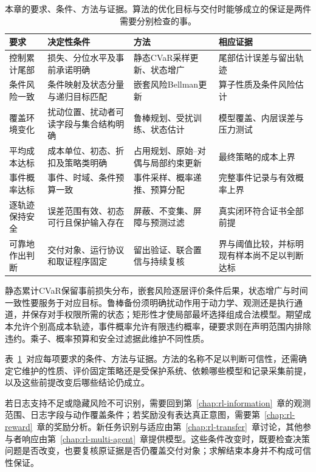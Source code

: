 \begin{table}[htbp]
  \centering
  \begin{tabularx}{\linewidth}{@{}>{\raggedright\arraybackslash}p{22mm}XXX@{}}
    \toprule
    要求 & 决定性条件 & 方法 & 相应证据 \\
    \midrule
    控制累计尾部 & 损失、分位水平及事前承诺明确 & 静态CVaR采样更新、状态增广 & 尾部估计误差与留出轨迹 \\
    条件风险一致 & 条件映射及状态分量与递归目标匹配 & 嵌套风险Bellman更新 & 算子性质及条件风险估计 \\
    覆盖环境变化 & 扰动位置、扰动者可读字段与集合结构明确 & 鲁棒规划、受扰训练、状态估计 & 模型覆盖、内层误差与压力测试 \\
    平均成本达标 & 成本单位、初态、折扣及策略类明确 & 占用规划、原始--对偶与局部约束更新 & 最终策略的成本上界 \\
    事件概率达标 & 事件、时域、条件预算一致 & 事件采样、概率递推、预算分配 & 完整事件记录与有效概率上界 \\
    逐轨迹保持安全 & 误差范围有效、初态可行且保护输入存在 & 屏蔽、不变集、屏障与预测过滤 & 真实闭环符合证书全部前提 \\
    可靠地作出判断 & 交付对象、运行协议和取证程序固定 & 留出验证、联合置信与持续复核 & 界与阈值比较，并标明现有样本尚不足以判断达标 \\
    \bottomrule
  \end{tabularx}
  \caption{本章的要求、条件、方法与证据。算法的优化目标与交付时能够成立的保证是两件需要分别检查的事。}
  \label{tab:rl-trustworthy-summary}
\end{table}

静态累计CVaR保留事前损失分布，嵌套风险逐层评价条件后果，状态增广与时间一致性要服务于对应目标。鲁棒备份须明确扰动作用于动力学、观测还是执行通道，并保存对手权限所需的状态；矩形性才使局部最坏选择组成合法模型。期望成本允许个别高成本轨迹，事件概率允许有限违约概率，硬要求则在声明范围内排除违约。乘子、概率预算和安全过滤据此维护不同性质。

表~\ref{tab:rl-trustworthy-summary}~对应每项要求的条件、方法与证据。方法的名称不足以判断可信性，还需确定它维护的性质、评价固定策略还是受保护系统、依赖哪些模型和记录采集前提，以及这些前提改变后哪些结论仍成立。



若日志支持不足或隐藏风险不可识别，需要回到第~\ref{chap:rl-information}~章的观测范围、日志字段与动作覆盖条件；若奖励没有表达真正意图，需要第~\ref{chap:rl-reward}~章的奖励分析。新任务识别与适应由第~\ref{chap:rl-transfer}~章讨论，其他参与者响应由第~\ref{chap:rl-multi-agent}~章提供模型。这些条件改变时，既要检查决策问题是否改变，也要复核原证据是否仍覆盖交付对象；求解结束本身并不构成可信性保证。
